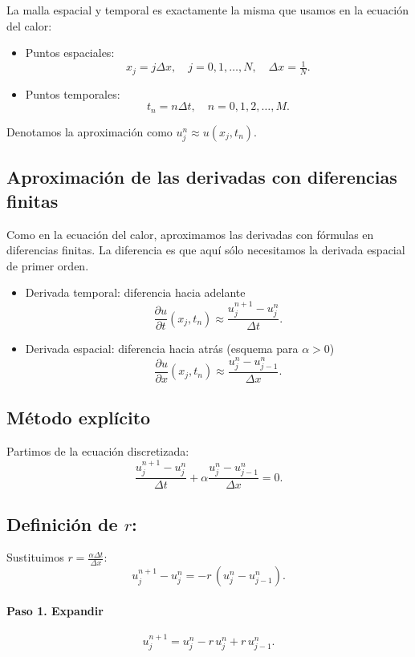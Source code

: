\documentclass[12pt,a4paper]{article}
\begin{document}
La malla espacial y temporal es exactamente la misma que usamos en la ecuación del calor:

\begin{itemize}
    \item Puntos espaciales:
    \[
    x_j = j \Delta x, \quad j = 0,1,\dots,N, \quad \Delta x = \tfrac{1}{N}.
    \]

    \item Puntos temporales:
    \[
    t_n = n\Delta t, \quad n = 0,1,2,\dots,M.
    \]
\end{itemize}

Denotamos la aproximación como $u_j^n \approx u(x_j,t_n)$.

\subsection{Aproximación de las derivadas con diferencias finitas}

Como en la ecuación del calor, aproximamos las derivadas con fórmulas en diferencias finitas.  
La diferencia es que aquí sólo necesitamos la derivada espacial de primer orden.

\begin{itemize}
    \item Derivada temporal: diferencia hacia adelante
    \[
    \frac{\partial u}{\partial t}(x_j,t_n) \approx \frac{u_j^{n+1}-u_j^n}{\Delta t}.
    \]

    \item Derivada espacial: diferencia hacia atrás (esquema para $\alpha>0$)
    \[
    \frac{\partial u}{\partial x}(x_j,t_n) \approx \frac{u_j^n - u_{j-1}^n}{\Delta x}.
    \]
\end{itemize}

\subsection{Método explícito}

Partimos de la ecuación discretizada:
\[
\frac{u_j^{n+1}-u_j^n}{\Delta t} + \alpha \frac{u_j^n - u_{j-1}^n}{\Delta x} = 0.
\]

\subsection*{Definición de $r$:}
Sustituimos $r = \tfrac{\alpha \Delta t}{\Delta x}$:
\[
u_j^{n+1}-u_j^n = -r\,(u_j^n - u_{j-1}^n).
\]

\paragraph{Paso 1. Expandir}  
\[
u_j^{n+1} = u_j^n - r\,u_j^n + r\,u_{j-1}^n.
\]
\end{document}
